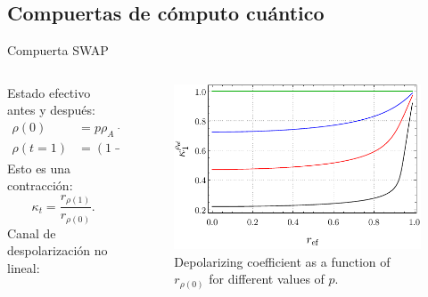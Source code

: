 \subsection{Compuertas de cómputo cuántico}
\begin{frame}{Compuerta SWAP}
    \begin{columns}
        \begin{column}{0.5\textwidth}
            Estado efectivo antes y después:
            \begin{align*}
                \rho(0)&=p\rho_{A}+(1-p)\rho_{B},\\
                \rho(t=1)&=(1-p)\rho_{A}+p\rho_{B}.
                \end{align*}
                Esto es una contracción:
                \begin{equation*}
                    \kappa_{t}=\frac{r_{\rho(1)}}{r_{\rho(0)}}.
                  \end{equation*}
                  Canal de despolarización no lineal:
                  \begin{center}
                  \end{center}
        \end{column}
        \begin{column}{0.5\textwidth}
            \begin{figure}[h!]
                \centering
                \includegraphics[width=0.9\linewidth]{figures/maxent_results/K(r).pdf}
                \caption{Depolarizing coefficient as a function of $r_{\rho(0)}$ for different values of $p$.}
              \end{figure}
        \end{column}
    \end{columns}
\end{frame}
